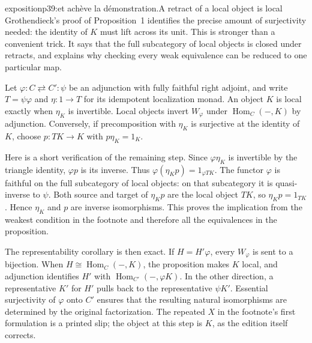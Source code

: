 \begin{dcomment}{exposition}{p39:et achève la démonstration.}{A retract of a local object is local}
Grothendieck's proof of Proposition~1 identifies the precise amount of surjectivity needed: the identity of $K$ must lift across its unit. This is stronger than a convenient trick. It says that the full subcategory of local objects is closed under retracts, and explains why checking every weak equivalence can be reduced to one particular map.

Let $\varphi:C\rightleftarrows C':\psi$ be an adjunction with fully faithful right adjoint, and write $T=\psi\varphi$ and $\eta:1\to T$ for its idempotent localization monad. An object $K$ is local exactly when $\eta_K$ is invertible. Local objects invert $W_\varphi$ under $\operatorname{Hom}_C(-,K)$ by adjunction. Conversely, if precomposition with $\eta_K$ is surjective at the identity of $K$, choose $p:TK\to K$ with $p\eta_K=1_K$.

Here is a short verification of the remaining step. Since $\varphi\eta_K$ is invertible by the triangle identity, $\varphi p$ is its inverse. Thus $\varphi(\eta_Kp)=1_{\varphi TK}$. The functor $\varphi$ is faithful on the full subcategory of local objects: on that subcategory it is quasi-inverse to $\psi$. Both source and target of $\eta_Kp$ are the local object $TK$, so $\eta_Kp=1_{TK}$. Hence $\eta_K$ and $p$ are inverse isomorphisms. This proves the implication from the weakest condition in the footnote and therefore all the equivalences in the proposition.

The representability corollary is then exact. If $H=H'\varphi$, every $W_\varphi$ is sent to a bijection. When $H\cong\operatorname{Hom}_C(-,K)$, the proposition makes $K$ local, and adjunction identifies $H'$ with $\operatorname{Hom}_{C'}(-,\varphi K)$. In the other direction, a representative $K'$ for $H'$ pulls back to the representative $\psi K'$. Essential surjectivity of $\varphi$ onto $C'$ ensures that the resulting natural isomorphisms are determined by the original factorization. The repeated $X$ in the footnote's first formulation is a printed slip; the object at this step is $K$, as the edition itself corrects.
\end{dcomment}

